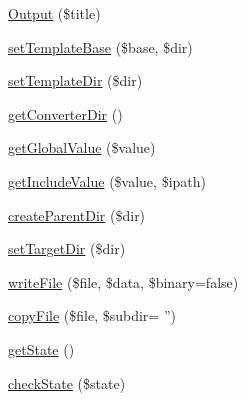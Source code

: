 \begin{DoxyCompactItemize}
\hyperlink{class_converter_a60c576df680e4a308193baa027644a2f}{\-Output} (\$title)
\item 
\hyperlink{class_converter_a162b6386dfd80b37d79e595aa1092c1e}{set\-Template\-Base} (\$base, \$dir)
\item 
\hyperlink{class_converter_a3b18827bcab9cfc5d259cba6fa5ec535}{set\-Template\-Dir} (\$dir)
\item 
\hyperlink{class_converter_a5c4615130a6e804a2d354be2bdbd2dbb}{get\-Converter\-Dir} ()
\item 
\hyperlink{class_converter_a91e68a982c5b0e517466b18d6ad5d572}{get\-Global\-Value} (\$value)
\item 
\hyperlink{class_converter_ad8ddc63b6c9a906ed8470d2a92018fc5}{get\-Include\-Value} (\$value, \$ipath)
\item 
\hyperlink{class_converter_ae289faa2df628300cee6223b5e6715a8}{create\-Parent\-Dir} (\$dir)
\item 
\hyperlink{class_converter_a07611111094b2954729773f6436a0fe1}{set\-Target\-Dir} (\$dir)
\item 
\hyperlink{class_converter_afb3d224527ece4c0df49fb93f1b3e032}{write\-File} (\$file, \$data, \$binary=false)
\item 
\hyperlink{class_converter_a637b4f52004414bad89be8b3699b9b5c}{copy\-File} (\$file, \$subdir= '')
\item 
\hyperlink{class_converter_afbf787ced76807989fb3093e1772c5a1}{get\-State} ()
\item 
\hyperlink{class_converter_a7a18d8cef379e6a32300ffde00946d26}{check\-State} (\$state)
\end{DoxyCompactItemize}
